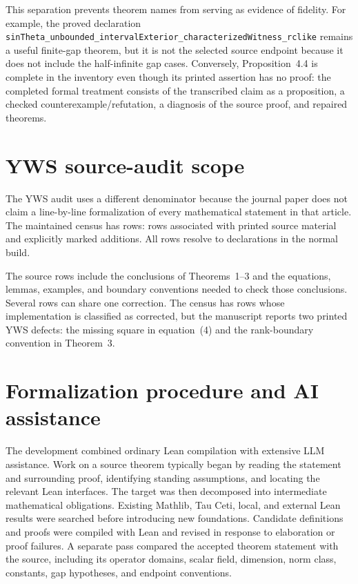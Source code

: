 This separation prevents theorem names from serving as evidence of fidelity.
For example, the proved declaration
\texttt{sinTheta\_unbounded\_intervalExterior\_characterizedWitness\_rclike}
remains a useful finite-gap theorem, but it is not the selected source endpoint
because it does not include the half-infinite gap cases.  Conversely,
Proposition~4.4 is complete in the inventory even though its printed assertion
has no proof: the completed formal treatment consists of the transcribed claim
as a proposition, a checked counterexample/refutation, a diagnosis of the
source proof, and repaired theorems.

\section{YWS source-audit scope}
\label{app:yws-coverage}

The YWS audit uses a different denominator because the journal paper does not
claim a line-by-line formalization of every mathematical statement in that
article.  The maintained census has \YWSCensusEntryCount{} rows:
\YWSCensusPaperSourceCount{} rows associated with printed source material and
\YWSCensusExplicitAdditionCount{} explicitly marked additions.  All
\YWSCensusVerifiedCount{} rows resolve to declarations in the normal build.

The source rows include the conclusions of Theorems~1--3 and the equations,
lemmas, examples, and boundary conventions needed to check those conclusions.
Several rows can share one correction.  The census has
\YWSCensusCorrectedCount{} rows whose implementation is classified as corrected,
but the manuscript reports two printed YWS defects: the missing square in
equation~(4) and the rank-boundary convention in Theorem~3.

\section{Formalization procedure and AI assistance}
\label{app:formalization-process}

The development combined ordinary Lean compilation with extensive LLM
assistance.  Work on a source theorem typically began by reading the statement
and surrounding proof, identifying standing assumptions, and locating the
relevant Lean interfaces.  The target was then decomposed into intermediate
mathematical obligations.  Existing Mathlib, Tau Ceti, local, and external Lean
results were searched before introducing new foundations.  Candidate
definitions and proofs were compiled with Lean and revised in response to
elaboration or proof failures.  A separate pass compared the accepted theorem
statement with the source, including its operator domains, scalar field,
dimension, norm class, constants, gap hypotheses, and endpoint conventions.


